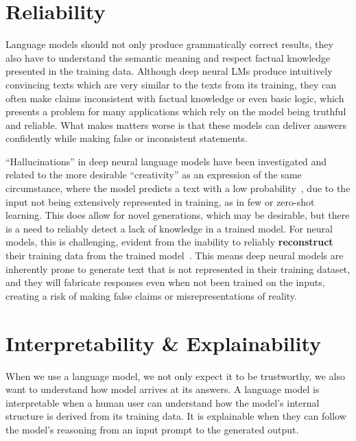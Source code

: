\section{Reliability}
Language models should not only produce grammatically correct results, they also have to understand the semantic meaning and respect factual knowledge presented in the training data. Although deep neural LMs produce intuitively convincing texts which are very similar to the texts from its training, they can often make claims inconsistent with factual knowledge or even basic logic, which presents a problem for many applications which rely on the model being truthful and reliable. What makes matters worse is that these models can deliver answers confidently while making false or inconsistent statements.

\noindent``Hallucinations'' in deep neural language models have been investigated and related to the more desirable ``creativity'' as an expression of the same circumstance, where the model predicts a text with a low probability~\cite{math11102320}, due to the input not being extensively represented in training, as in few or zero-shot learning. This does allow for novel generations, which may be desirable, but there is a need to reliably detect a lack of knowledge in a trained model. For neural models, this is challenging, evident from the inability to reliably \textbf{reconstruct} their training data from the trained model~\cite{haim2022reconstructing}. This means deep neural models are inherently prone to generate text that is not represented in their training dataset, and they will fabricate responses even when not been trained on the inputs, creating a risk of making false claims or misrepresentations of reality.


\section{Interpretability \& Explainability}
When we use a language model, we not only expect it to be trustworthy, we also want to understand how model arrives at its answers. A language model is interpretable when a human user can understand how the model's internal structure is derived from its training data. It is explainable when they can follow the model's reasoning from an input prompt to the generated output. 

